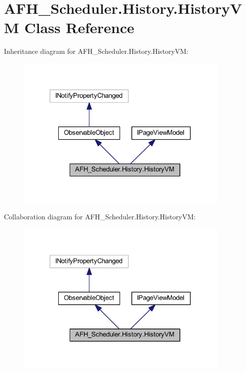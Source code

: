 \section{A\+F\+H\+\_\+\+Scheduler.\+History.\+History\+VM Class Reference}
\label{class_a_f_h___scheduler_1_1_history_1_1_history_v_m}


Inheritance diagram for A\+F\+H\+\_\+\+Scheduler.\+History.\+History\+VM\+:
\nopagebreak
\begin{figure}[H]
\begin{center}
\leavevmode
\includegraphics[width=293pt]{class_a_f_h___scheduler_1_1_history_1_1_history_v_m__inherit__graph}
\end{center}
\end{figure}


Collaboration diagram for A\+F\+H\+\_\+\+Scheduler.\+History.\+History\+VM\+:
\nopagebreak
\begin{figure}[H]
\begin{center}
\leavevmode
\includegraphics[width=293pt]{class_a_f_h___scheduler_1_1_history_1_1_history_v_m__coll__graph}
\end{center}
\end{figure}
